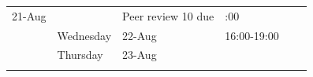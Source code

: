 \documentclass[]{book}
\theoremstyle{definition}
\theoremstyle{definition}
\theoremstyle{definition}
\theoremstyle{remark}
\begin{document}
\begin{longtable}[]{@{}rllllr@{}}
\begin{minipage}[t]{0.09\columnwidth}
21-Aug\strut
\end{minipage} & \begin{minipage}[t]{0.16\columnwidth}\raggedright
\strut
\end{minipage} & \begin{minipage}[t]{0.29\columnwidth}\raggedright
Peer review 10 due\strut
\end{minipage} & \begin{minipage}[t]{0.08\columnwidth}\raggedleft
17:00\strut
\end{minipage}\tabularnewline
\begin{minipage}[t]{0.08\columnwidth}\raggedleft
\strut
\end{minipage} & \begin{minipage}[t]{0.12\columnwidth}\raggedright
Wednesday\strut
\end{minipage} & \begin{minipage}[t]{0.09\columnwidth}\raggedright
22-Aug\strut
\end{minipage} & \begin{minipage}[t]{0.16\columnwidth}\raggedright
16:00-19:00\strut
\end{minipage} & \begin{minipage}[t]{0.29\columnwidth}\raggedright
\strut
\end{minipage} & \begin{minipage}[t]{0.08\columnwidth}\raggedleft
\strut
\end{minipage}\tabularnewline
\begin{minipage}[t]{0.08\columnwidth}\raggedleft
\strut
\end{minipage} & \begin{minipage}[t]{0.12\columnwidth}\raggedright
Thursday\strut
\end{minipage} & \begin{minipage}[t]{0.09\columnwidth}\raggedright
23-Aug\strut
\end{minipage} & \begin{minipage}[t]{0.16\columnwidth}\raggedright
\strut
\end{minipage} & \begin{minipage}[t]{0.29\columnwidth}\raggedright
\strut
\end{minipage} & \begin{minipage}[t]{0.08\columnwidth}\raggedleft
\strut
\end{minipage}\tabularnewline
\begin{minipage}[t]{0.08\columnwidth}\raggedleft
\strut
\end{minipage} & \begin{minipage}[t]{0.12\columnwidth}\raggedright

\end{minipage}
\end{longtable}
\end{document}

